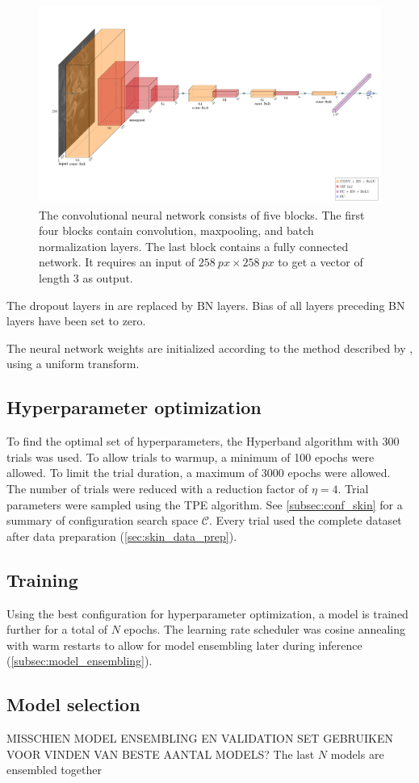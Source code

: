 \begin{figure}
    \includegraphics{skinstression/images/model.pdf}
    \caption[Network architecture]{
        The convolutional neural network consists of five blocks.
        The first four blocks contain convolution, maxpooling, and batch normalization layers.
        The last block contains a fully connected network.
        It requires an input of $\SI{258}{px}\times\SI{258}{px}$ to get a vector of length 3 as output.
    }
    \label{fig:model}
\end{figure}

The dropout layers in \cite{Soylu2022} are replaced by BN layers.
Bias of all layers preceding BN layers have been set to zero.

The neural network weights are initialized according to the method described by \textcite{He2015}, using a uniform transform.

\subsection{Hyperparameter optimization}
To find the optimal set of hyperparameters, the Hyperband algorithm with 300 trials was used.
To allow trials to warmup, a minimum of 100 epochs were allowed.
To limit the trial duration, a maximum of 3000 epochs were allowed.
The number of trials were reduced with a reduction factor of $\eta=4$.
Trial parameters were sampled using the TPE algorithm.
See \cref{subsec:conf_skin} for a summary of configuration search space $\mathcal{C}$.
Every trial used the complete dataset after data preparation (\cref{sec:skin_data_prep}).

\subsection{Training}
Using the best configuration for hyperparameter optimization, a model is trained further for a total of $N$ epochs.
The learning rate scheduler was cosine annealing with warm restarts to allow for model ensembling later during inference (\cref{subsec:model_ensembling}).

\subsection{Model selection}
MISSCHIEN MODEL ENSEMBLING EN VALIDATION SET GEBRUIKEN VOOR VINDEN VAN BESTE AANTAL MODELS?
The last $N$ models are ensembled together